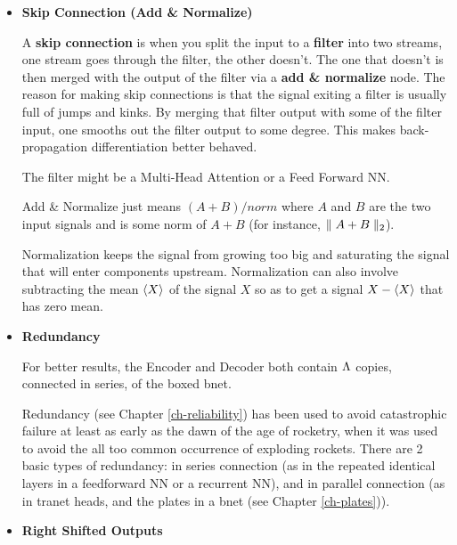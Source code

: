 \begin{itemize}
\beq
P^\alp=
{\sum_{\alp\in[n]} \exp(e^\alp )}
\;\;
\left(P^{[n]}=
{_0}
\right)
\eeq

For example,
\beq
(1,0,0)\rarrow (e,1,1)/norm
\eeq

\beq
(10,0,0)\rarrow (e^{10}, 1, 1)/norm \approx (1,0,0)
\eeq

For any $a\in\RR$,
\beq
(a,a,a)\rarrow {}(1, 1, 1)
\eeq


\item {\bf Skip Connection (Add \& Normalize)}

A {\bf skip connection} is when you split the
input to a {\bf filter} into two streams, one stream goes through
the filter, the other doesn't. The one that doesn't
is then merged with the output of the filter via a {\bf add \& normalize} node. The reason for making skip connections
is that the signal exiting a filter is usually full of
jumps and kinks. By merging that filter output
with some  of the filter input, one smooths out the filter output
to some degree. This makes back-propagation differentiation
better behaved.

The filter might be a Multi-Head Attention or a Feed Forward NN.

Add \& Normalize just means $(A + B)/norm$ where $A$ and $B$
are the two input signals and  is some norm of $A+B$ (for
instance, $\parallel A+B\parallel_2$).

Normalization keeps the signal from growing too big and saturating the signal that will enter components upstream.
Normalization can also involve subtracting the mean $\left\langle X\right\rangle$ of the signal $X$  so as to get a signal $X-\left\langle X\right\rangle$  that has zero mean.

\item {\bf Redundancy}

For better results, the Encoder
and Decoder both contain $\Lambda$
copies, connected in series, of the boxed bnet.

Redundancy (see Chapter \ref{ch-reliability}) has been used to
avoid catastrophic failure at least as early as
the dawn of the age
of rocketry, when it
was used to avoid the all too common
occurrence of exploding rockets.
There are 2 basic types of
redundancy: in series connection (as in the repeated identical
layers in a feedforward
NN or a recurrent NN),
and in parallel connection (as in
tranet heads, and the plates in a bnet (see Chapter \ref{ch-plates})).

\item{\bf Right Shifted Outputs}


\end{itemize}
